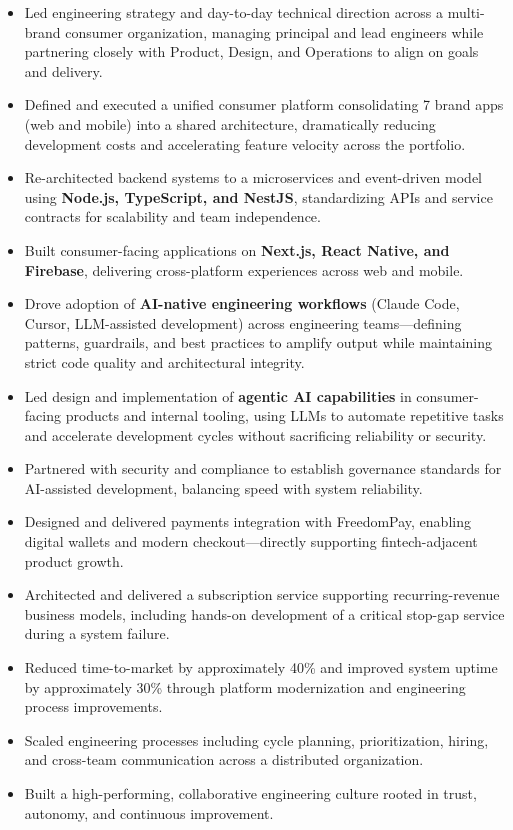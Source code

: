 \documentclass[11pt]{article}
\begin{document}
\begin{itemize}
  \item Led engineering strategy and day-to-day technical direction across a multi-brand consumer organization, managing principal and lead engineers while partnering closely with Product, Design, and Operations to align on goals and delivery.
  \item Defined and executed a unified consumer platform consolidating 7 brand apps (web and mobile) into a shared architecture, dramatically reducing development costs and accelerating feature velocity across the portfolio.
  \item Re-architected backend systems to a microservices and event-driven model using \textbf{Node.js, TypeScript, and NestJS}, standardizing APIs and service contracts for scalability and team independence.
  \item Built consumer-facing applications on \textbf{Next.js, React Native, and Firebase}, delivering cross-platform experiences across web and mobile.
  \item Drove adoption of \textbf{AI-native engineering workflows} (Claude Code, Cursor, LLM-assisted development) across engineering teams---defining patterns, guardrails, and best practices to amplify output while maintaining strict code quality and architectural integrity.
  \item Led design and implementation of \textbf{agentic AI capabilities} in consumer-facing products and internal tooling, using LLMs to automate repetitive tasks and accelerate development cycles without sacrificing reliability or security.
  \item Partnered with security and compliance to establish governance standards for AI-assisted development, balancing speed with system reliability.
  \item Designed and delivered payments integration with FreedomPay, enabling digital wallets and modern checkout---directly supporting fintech-adjacent product growth.
  \item Architected and delivered a subscription service supporting recurring-revenue business models, including hands-on development of a critical stop-gap service during a system failure.
  \item Reduced time-to-market by approximately 40\% and improved system uptime by approximately 30\% through platform modernization and engineering process improvements.
  \item Scaled engineering processes including cycle planning, prioritization, hiring, and cross-team communication across a distributed organization.
  \item Built a high-performing, collaborative engineering culture rooted in trust, autonomy, and continuous improvement.
\end{itemize}
\end{document}
